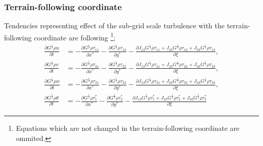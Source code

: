 \subsubsection{Terrain-following coordinate}
Tendencies representing effect of the sub-grid scale turbulence with the terrain-following coordinate are following
\footnote{Equations which are not changed in the terrain-following coordinate are ommited.};
\begin{align}
  \frac{\partial G^{\frac{1}{2}}\rho u}{\partial t}
  &=
  - \frac{\partial G^{\frac{1}{2}}\rho\tau_{11}}{\partial x^*}
  - \frac{\partial G^{\frac{1}{2}}\rho\tau_{12}}{\partial y^*}
  - \frac{\partial J_{13}G^{\frac{1}{2}}\rho\tau_{11} + J_{23}G^{\frac{1}{2}}\rho\tau_{12} + J_{33}G^{\frac{1}{2}}\rho\tau_{13}}{\partial \xi}, \\
  \frac{\partial G^{\frac{1}{2}}\rho v}{\partial t}
  &=
  - \frac{\partial G^{\frac{1}{2}}\rho\tau_{21}}{\partial x^*}
  - \frac{\partial G^{\frac{1}{2}}\rho\tau_{22}}{\partial y^*}
  - \frac{\partial J_{13}G^{\frac{1}{2}}\rho\tau_{21} + J_{23}G^{\frac{1}{2}}\rho\tau_{22} + J_{33}G^{\frac{1}{2}}\rho\tau_{23}}{\partial \xi}, \\
  \frac{\partial G^{\frac{1}{2}}\rho w}{\partial t}
  &=
  - \frac{\partial G^{\frac{1}{2}}\rho\tau_{31}}{\partial x^*}
  - \frac{\partial G^{\frac{1}{2}}\rho\tau_{32}}{\partial y^*}
  - \frac{\partial J_{13}G^{\frac{1}{2}}\rho\tau_{31} + J_{23}G^{\frac{1}{2}}\rho\tau_{32} + J_{33}G^{\frac{1}{2}}\rho\tau_{33}}{\partial \xi}, \\
  \frac{\partial G^{\frac{1}{2}} \rho \theta}{\partial t}
  &=
  - \frac{\partial G^{\frac{1}{2}}\rho\tau^*_1}{\partial x^*}
  - \frac{\partial G^{\frac{1}{2}}\rho\tau^*_2}{\partial y^*}
  - \frac{\partial J_{13}G^{\frac{1}{2}}\rho\tau^*_1 + J_{23}G^{\frac{1}{2}}\rho\tau^*_2 + J_{33}G^{\frac{1}{2}}\rho\tau^*_3}{\partial \xi}
\end{align}
